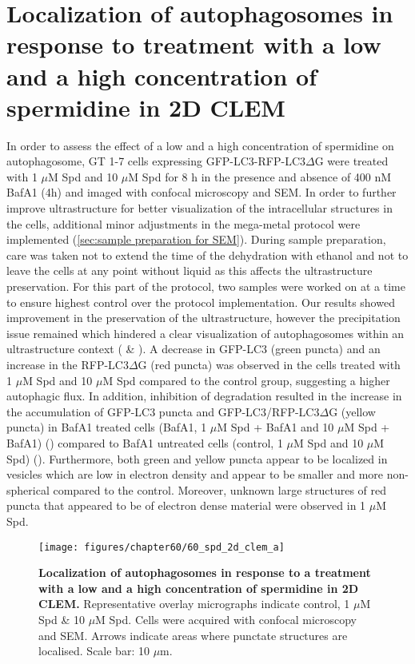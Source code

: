 \section{Localization of autophagosomes in response to treatment with a low and a high concentration of spermidine in 2D CLEM}\label{sec:localization_autophagosomes_low_high_spermidine_2DCLEM}
In order to assess the effect of a low and a high concentration of spermidine on autophagosome, GT 1-7 cells expressing GFP-LC3-RFP-LC3$\Delta$G were treated with 1 $\mu$M Spd and 10 $\mu$M Spd for 8 h in the presence and absence of 400 nM BafA1 (4h) and imaged with confocal microscopy and SEM. In order to further improve ultrastructure for better visualization of the intracellular structures in the cells, additional minor adjustments in the mega-metal protocol were implemented (\cref{sec:sample preparation for SEM}). During sample preparation, care was taken not to extend the time of the dehydration with ethanol and not to leave the cells at any point without liquid as this affects the ultrastructure preservation. For this part of the protocol, two samples were worked on at a time to ensure highest control over the protocol implementation. Our results showed improvement in the preservation of the ultrastructure, however the precipitation issue remained which hindered a clear visualization of autophagosomes within an ultrastructure context ( \& ). A decrease in GFP-LC3 (green puncta) and an increase in the RFP-LC3$\Delta$G (red puncta) was observed in the cells treated with 1 $\mu$M Spd and 10 $\mu$M Spd compared to the control group, suggesting a higher autophagic flux. In addition, inhibition of degradation resulted in the increase in the accumulation of GFP-LC3 puncta  and GFP-LC3/RFP-LC3$\Delta$G (yellow puncta) in BafA1 treated cells (BafA1, 1 $\mu$M Spd + BafA1 and 10 $\mu$M Spd + BafA1) () compared to BafA1 untreated cells (control, 1 $\mu$M Spd and 10 $\mu$M Spd) (). Furthermore, both green and yellow puncta appear to be localized in vesicles which are low in electron density and appear to be smaller and more non-spherical compared to the control. Moreover, unknown large structures of red puncta that appeared to be of electron dense material were observed in 1 $\mu$M Spd. 

\begin{landscape}
\begin{figure}[!htbp]
\center
  \texttt{[image: figures/chapter60/60\_spd\_2d\_clem\_a]}
  \caption[Localization of autophagosomes in response to a treatment with a low and a high concentration of spermidine in 2D CLEM]{\textbf{Localization of autophagosomes in response to a treatment with a low and a high concentration of spermidine in 2D CLEM.} Representative overlay micrographs indicate control, 1 $\mu$M Spd \& 10 $\mu$M Spd. Cells were acquired with confocal microscopy and SEM. Arrows indicate areas where punctate structures are localised. Scale bar: 10 $\mu$m.}
  \label{fig:60_spd_2d_clem_a}
\end{figure} 
\end{landscape}


